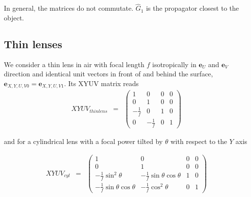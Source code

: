 \documentclass[12pt,a4paper,twoside,openright,BCOR10mm,headsepline,titlepage,abstracton,chapterprefix,final]{scrreprt}
\newcommand\Vector[1]{{\mathbf{#1}}}
\begin{document}
In general, the matrices do not commutate. $\hat{G}_1$ is the propagator closest to the object.


\subsection{Thin lenses}
We consider a thin lens in air with focal length $f$ isotropically in $\Vector{e}_U$ and $\Vector{e}_V$ direction
and identical unit vectors in front of and behind the surface, $\Vector{e}_{X,Y,U,V 0} = \Vector{e}_{X,Y,U,V 1}$.
Its XYUV matrix reads
\begin{eqnarray}
XYUV_{thin lens} &=&
 \begin{pmatrix}
  1 & 0 & 0 & 0 \\
  0 & 1 & 0 & 0 \\
  -\frac{1}{f} & 0 & 1 & 0 \\
  0 & -\frac{1}{f} & 0 & 1
 \end{pmatrix}
\end{eqnarray}

and for a cylindrical lens with a focal power tilted by $\theta$ with respect to the $Y$ axis

\begin{eqnarray}
XYUV_{cyl} &=&
 \begin{pmatrix}
  1 & 0 & 0 & 0 \\
  0 & 1 & 0 & 0 \\
  -\frac{1}{f} \sin^2\theta & -\frac{1}{f} \sin\theta \cos\theta & 1 & 0 \\
  -\frac{1}{f} \sin\theta \cos\theta & -\frac{1}{f} \cos^2\theta & 0 & 1
 \end{pmatrix}
\end{eqnarray}
\end{document}
